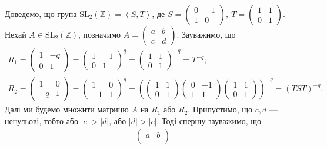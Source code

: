 \documentclass{math_library}
\begin{document}
\begin{example}
Доведемо, що група $\mathrm{SL}_2(\mathbb{Z}) = \left< S,T \right>$, де $S = \begin{pmatrix}
0 & -1 \\
1 & 0
\end{pmatrix},\ T = \begin{pmatrix}
1 & 1 \\
0 & 1
\end{pmatrix}$.
\bigskip \\
Нехай $A \in \mathrm{SL}_2(\mathbb{Z})$, позначимо $A = \begin{pmatrix}
a & b \\
c & d
\end{pmatrix}$. Зауважимо, що
\begin{align*}
R_1 = \begin{pmatrix}
1 & -q \\
0 & 1
\end{pmatrix} = \begin{pmatrix}
1 & -1 \\
0 & 1
\end{pmatrix}^q = \begin{pmatrix}
1 & 1 \\
0 & 1
\end{pmatrix}^{-q} = T^{-q}; \\
R_2 = \begin{pmatrix}
1 & 0 \\
-q & 1
\end{pmatrix} = \begin{pmatrix}
1 & 0 \\
-1 & 1
\end{pmatrix}^q = \left(\begin{pmatrix}
1 & 1 \\
0 & 1
\end{pmatrix} \begin{pmatrix}
0 & -1 \\
1 & 1
\end{pmatrix} \begin{pmatrix}
1 & 1 \\
0 & 1
\end{pmatrix}\right)^{-q} = (TST)^{-q}.
\end{align*}
Далі ми будемо множити матрицю $A$ на $R_1$ або $R_2$. Припустимо, що $c,d$ --- ненульові, тобто або $|c| > |d|$, або $|d| > |c|$. Тоді спершу зауважимо, що
\begin{align*}
\begin{pmatrix}
a & b \\

\end{pmatrix}
\end{align*}
\end{example}
\end{document}
